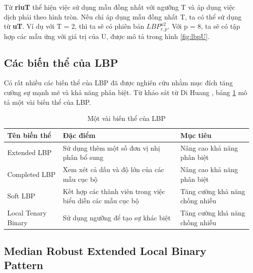  Từ \textbf{riuT} thể hiện việc sử dụng mẫu đồng nhất với ngưỡng T và áp dụng việc dịch phải theo hình tròn. Nếu chỉ áp dụng mẫu đồng nhất T, ta có thể sử dụng từ \textbf{uT}. Ví dụ với T = 2, thì ta sẽ có phiên bản $LBP_{r, p}^{u2}$. Với p = 8, ta sẽ có tập hợp các mẫu ứng với giá trị của U, được mô tả trong hình \ref{fig:lbpU}.
\subsection{Các biến thể của LBP}
Có rất nhiều các biến thể của LBP đã được nghiên cứu nhằm mục đích tăng cường sự mạnh mẽ và khả năng phân biệt. Từ khảo sát từ Di Huang \cite{lbpVariantSurvey}, bảng \ref{tab:lbpVariant} mô tả một vài biến thể của LBP. 


\begin{table}[h]
    \centering
    \renewcommand{\arraystretch}{1.3} %
        \caption{Một vài biến thể của LBP}
    \begin{tabular}{p{4cm} p{7cm} p{3cm}}
        \toprule
        \textbf{Tên biến thể} & \textbf{Đặc điểm} & \textbf{Mục tiêu} \\
        \midrule
        Extended LBP & Sử dụng thêm một số đơn vị nhị phân bổ sung  & Nâng cao khả năng phân biệt
        \\ \midrule
        Completed LBP & Xem xét cả dấu và độ lớn của các mẫu cục bộ & Nâng cao khả năng phân biệt
        \\ \midrule
        Soft LBP & Kết hợp các thành viên trong việc biểu diễn các mẫu cục bộ & Tăng cường khả năng chống nhiễu
        \\ \midrule 
        Local Tenary Binary & Sử dụng ngưỡng để tạo sự khác biệt & Tăng cường khả năng chống nhiễu
        \\
                   \bottomrule

    \end{tabular}

    \label{tab:lbpVariant}
\end{table}



\newpage
\subsection{Median Robust Extended Local Binary Pattern}

